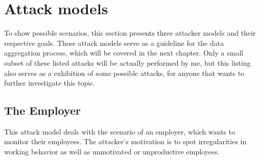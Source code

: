 \section{Attack models}\label{attack-models}
To show possible scenarios, this section presents three attacker models and their respective goals.
These attack models serve as a guideline for the data aggregation process, which will be covered in the next chapter.
Only a small subset of these listed attacks will be actually performed by me, but this listing also serves as a exhibition of some possible attacks, for anyone that wants to further investigate this topic.

\subsection{The Employer}\label{employer-monitoring}
This attack model deals with the scenario of an employer, which wants to monitor their employees.
The attacker's motivation is to spot irregularities in working behavior as well as unmotivated or unproductive employees.


